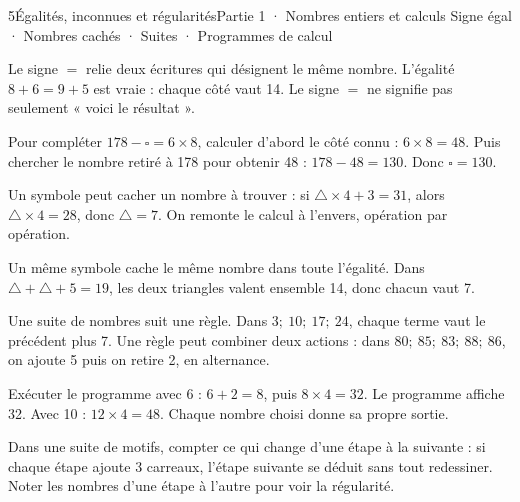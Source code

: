 \begin{ouverture}[algorithmique]{5}{Égalités, inconnues et régularités}{Partie 1 · Nombres entiers et calculs}
{Signe égal · Nombres cachés · Suites · Programmes de calcul}
\end{ouverture}
\pagestyle{otMain}\essentiel\fontsize{11}{15}\selectfont
{}\label{cours-5-1}
\begin{definition}Le signe $=$ relie deux écritures qui désignent le même nombre. L’égalité $8+6=9+5$ est vraie : chaque côté vaut 14. Le signe $=$ ne signifie pas seulement « voici le résultat ».\end{definition}
\begin{savoirfaire}Pour compléter $178-\square=6\times8$, calculer d’abord le côté connu : $6\times8=48$. Puis chercher le nombre retiré à 178 pour obtenir 48 : $178-48=130$. Donc $\square=130$.\end{savoirfaire}
\begin{exemple}Un symbole peut cacher un nombre à trouver : si $\triangle\times4+3=31$, alors $\triangle\times4=28$, donc $\triangle=7$. On remonte le calcul à l’envers, opération par opération.\end{exemple}
\begin{attention}Un même symbole cache le même nombre dans toute l’égalité. Dans $\triangle+\triangle+5=19$, les deux triangles valent ensemble 14, donc chacun vaut 7.\end{attention}
\clearpage
{}\label{cours-5-2}
\begin{definition}Une suite de nombres suit une règle. Dans $3 ;\ 10 ;\ 17 ;\ 24$, chaque terme vaut le précédent plus 7. Une règle peut combiner deux actions : dans $80 ;\ 85 ;\ 83 ;\ 88 ;\ 86$, on ajoute 5 puis on retire 2, en alternance.\end{definition}
\label{fig-cours-5-2-prog-cours}

\begin{exemple}Exécuter le programme avec 6 : $6+2=8$, puis $8\times4=32$. Le programme affiche 32. Avec 10 : $12\times4=48$. Chaque nombre choisi donne sa propre sortie.\end{exemple}
\begin{savoirfaire}Dans une suite de motifs, compter ce qui change d’une étape à la suivante : si chaque étape ajoute 3 carreaux, l’étape suivante se déduit sans tout redessiner. Noter les nombres d’une étape à l’autre pour voir la régularité.\end{savoirfaire}

